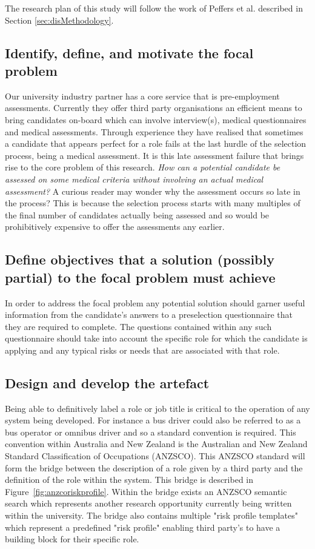 The research plan of this study will follow the work of Peffers et al. described in Section \ref{sec:disMethodology}.

\subsection{Identify, define, and motivate the focal problem}

Our university industry partner has a core service that is pre-employment assessments.
Currently they offer third party organisations an efficient means to bring
candidates on-board which can involve interview(s), medical questionnaires and medical
assessments. Through experience they have realised that sometimes a candidate that appears
perfect for a role fails at the last hurdle of the selection process, being a medical assessment.
It is this late assessment failure that brings rise to the core problem of this research. \textit{How can
    a potential candidate be assessed on some medical criteria without involving an actual medical
    assessment?} A curious reader may wonder why the assessment occurs so late in the process?
This is because the selection process
starts with many multiples of the final number of candidates actually being assessed and so would be prohibitively expensive
to offer the assessments any earlier.


\subsection{Define objectives that a solution (possibly partial) to the focal problem must achieve}

In order to address the focal problem any potential solution should garner useful information from the candidate's answers
to a preselection questionnaire that they are required to complete. The questions contained
within any such questionnaire should take into account the specific role for which the candidate is applying
and any typical risks or needs that are associated with that role.

\subsection{Design and develop the artefact}

Being able to definitively label a role or job title is critical to the operation of any system being developed.
For instance a bus driver could also be referred to as a bus operator or omnibus driver and so a standard convention
is required. This convention within Australia and New Zealand is the Australian and New Zealand Standard Classification
of Occupations (ANZSCO). This ANZSCO standard will form the bridge between the description of a role given by
a third party and the definition of the role within the system. This bridge is described in Figure~\ref{fig:anzcoriskprofile}.
Within the bridge exists an ANZSCO semantic search which represents another research opportunity currently being written
within the university. The bridge also contains multiple "risk profile templates" which represent a predefined "risk profile"
enabling third party's to have a building block for their specific role.

